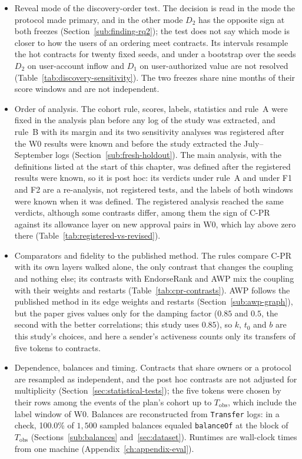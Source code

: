 \begin{itemize}
\item Reveal mode of the discovery-order test. The decision is read in the mode the protocol made primary, and in the other mode $D_2$ has the opposite sign at both freezes (Section~\ref{sub:finding-rq2}); the test does not say which mode is closer to how the users of an ordering meet contracts. Its intervals resample the hot contracts for twenty fixed seeds, and under a bootstrap over the seeds $D_2$ on user-account inflow and $D_1$ on user-authorized value are not resolved (Table~\ref{tab:discovery-sensitivity}). The two freezes share nine months of their score windows and are not independent.
\item Order of analysis. The cohort rule, scores, labels, statistics and rule~A were fixed in the analysis plan before any log of the study was extracted, and rule~B with its margin and its two sensitivity analyses was registered after the W0 results were known and before the study extracted the July--September logs (Section~\ref{sub:fresh-holdout}). The main analysis, with the definitions listed at the start of this chapter, was defined after the registered results were known, so it is post hoc: its verdicts under rule~A and under F1 and F2 are a re-analysis, not registered tests, and the labels of both windows were known when it was defined. The registered analysis reached the same verdicts, although some contrasts differ, among them the sign of \mbox{C-PR} against its allowance layer on new approval pairs in W0, which lay above zero there (Table~\ref{tab:registered-vs-revised}).
\item Comparators and fidelity to the published method. The rules compare \mbox{C-PR} with its own layers walked alone, the only contrast that changes the coupling and nothing else; its contrasts with EndorseRank and AWP mix the coupling with their weights and restarts (Table~\ref{tab:cpr-contrasts}). AWP follows the published method in its edge weights and restarts (Section~\ref{sub:awp-graph}), but the paper gives values only for the damping factor ($0.85$ and $0.5$, the second with the better correlations; this study uses $0.85$), so $k$, $t_0$ and $b$ are this study's choices, and here a sender's activeness counts only its transfers of five tokens to contracts.
\item Dependence, balances and timing. Contracts that share owners or a protocol are resampled as independent, and the post hoc contrasts are not adjusted for multiplicity (Section~\ref{sec:statistical-tests}); the five tokens were chosen by their rows among the events of the plan's cohort up to $T_{\mathrm{obs}}$, which include the label window of W0. Balances are reconstructed from \texttt{Transfer} logs: in a check, 100.0\% of $1{,}500$ sampled balances equaled \texttt{balanceOf} at the block of $T_{\mathrm{obs}}$ (Sections~\ref{sub:balances} and~\ref{sec:dataset}). Runtimes are wall-clock times from one machine (Appendix~\ref{ch:appendix-eval}).
\end{itemize}

